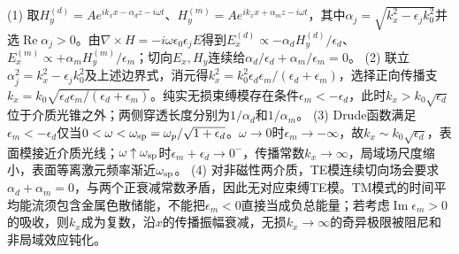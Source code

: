 (1) 取\(H_y^{(d)}=A e^{ik_xx-\alpha_d z-i\omega t}\)、\(H_y^{(m)}=A e^{ik_xx+\alpha_m z-i\omega t}\)，其中\(\alpha_j=\sqrt{k_x^2-\epsilon_j k_0^2}\)并选\(\operatorname{Re}\alpha_j>0\)。由\(\nabla\times H=-i\omega\epsilon_0\epsilon_jE\)得到\(E_x^{(d)}\propto-\alpha_d H_y^{(d)}/\epsilon_d\)、\(E_x^{(m)}\propto+\alpha_mH_y^{(m)}/\epsilon_m\)；切向\(E_x,H_y\)连续给\(\alpha_d/\epsilon_d+\alpha_m/\epsilon_m=0\)。
(2) 联立\(\alpha_j^2=k_x^2-\epsilon_j k_0^2\)及上述边界式，消元得\(k_x^2=k_0^2\epsilon_d\epsilon_m/(\epsilon_d+\epsilon_m)\)，选择正向传播支\(k_x=k_0\sqrt{\epsilon_d\epsilon_m/(\epsilon_d+\epsilon_m)}\)。纯实无损束缚模存在条件\(\epsilon_m<-\epsilon_d\)，此时\(k_x>k_0\sqrt{\epsilon_d}\)位于介质光锥之外；两侧穿透长度分别为\(1/\alpha_d\)和\(1/\alpha_m\)。
(3) Drude函数满足\(\epsilon_m<-\epsilon_d\)仅当\(0<\omega<\omega_{\rm sp}=\omega_p/\sqrt{1+\epsilon_d}\)。\(\omega\to0\)时\(\epsilon_m\to-\infty\)，故\(k_x\sim k_0\sqrt{\epsilon_d}\)，表面模接近介质光线；\(\omega\uparrow\omega_{\rm sp}\)时\(\epsilon_m+\epsilon_d\to0^-\)，传播常数\(k_x\to\infty\)，局域场尺度缩小，表面等离激元频率渐近\(\omega_{\rm sp}\)。
(4) 对非磁性两介质，TE模连续切向场会要求\(\alpha_d+\alpha_m=0\)，与两个正衰减常数矛盾，因此无对应束缚TE模。TM模式的时间平均能流须包含金属色散储能，不能把\(\epsilon_m<0\)直接当成负总能量；若考虑\(\operatorname{Im}\epsilon_m>0\)的吸收，则\(k_x\)成为复数，沿\(x\)的传播振幅衰减，无损\(k_x\to\infty\)的奇异极限被阻尼和非局域效应钝化。

